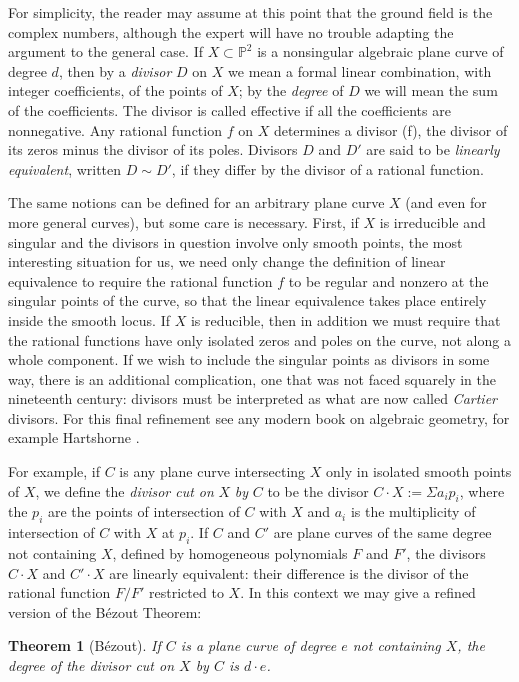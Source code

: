 \documentclass{bull-l}
\newtheorem{thm}[prop]{Theorem}
\theoremstyle{pplain}
\theoremstyle{definition}
\begin{document}
For simplicity, the reader may assume at this point that the ground field is
the complex numbers, although the expert will have no trouble adapting the
argument to the general case.  If $X\subset \mathbb{P}^2$ is a nonsingular 
algebraic plane curve of degree $d$, then by a \emph{divisor} $D$ on $X$ we
mean a formal linear combination, with integer coefficients, of the points of
$X$; by the \emph{degree} of $D$ we will mean the sum of the coefficients.  The
divisor is called effective if all the coefficients are nonnegative.  Any
rational function $f$ on $X$ determines a divisor (f), the divisor of its zeros
minus the divisor of its poles.  Divisors $D$ and $D'$ are said to be \emph{
linearly equivalent}, written $D\sim D'$, if they differ by the divisor of a
rational function.

The same notions can be defined for an arbitrary plane curve $X$ (and even for
more general curves), but some care is necessary.  First, if $X$ is irreducible
and singular and the divisors in question involve only smooth points, the most
interesting situation for us, we need only change the definition of linear
equivalence to require the rational function $f$ to be regular and nonzero at
the singular points of the curve, so that the linear equivalence takes place
entirely inside the smooth locus.  If $X$ is reducible, then in addition we
must require that the rational functions have only isolated zeros and poles on
the curve, not along a whole component.  If we wish to include the singular 
points as divisors in some way, there is an additional complication, one that
was not faced squarely in the nineteenth century: divisors must be interpreted
as what are now called \emph{Cartier} divisors.  For this final refinement see
any modern book on algebraic geometry, for example Hartshorne \cite{H}.

For example, if $C$ is any plane curve intersecting $X$ only in isolated smooth 
points of $X$, we define the \emph{divisor cut on} $X$ \emph{by} $C$ to be the
divisor $C\cdot X:=\Sigma a_ip_i$, where the $p_i$ are the points of
intersection of $C$ with $X$ and $a_i$ is the multiplicity of intersection of
$C$ with $X$ at $p_i$.  If $C$ and $C'$ are plane curves of the same degree not
containing $X$, defined by homogeneous polynomials $F$ and $F'$, the divisors
$C\cdot X$ and $C'\cdot X$ are linearly equivalent: their difference is the
divisor of the rational function $F/F'$ restricted to $X$.  In this context we
may give a refined version of the B\'ezout Theorem:

\begin{thm}[B\'ezout]\label{thm:two}
If $C$ is a plane curve of degree $e$ not containing $X$, the degree of
the divisor cut on $X$ by $C$ is $d\cdot e$.
\end{thm}
\end{document}
